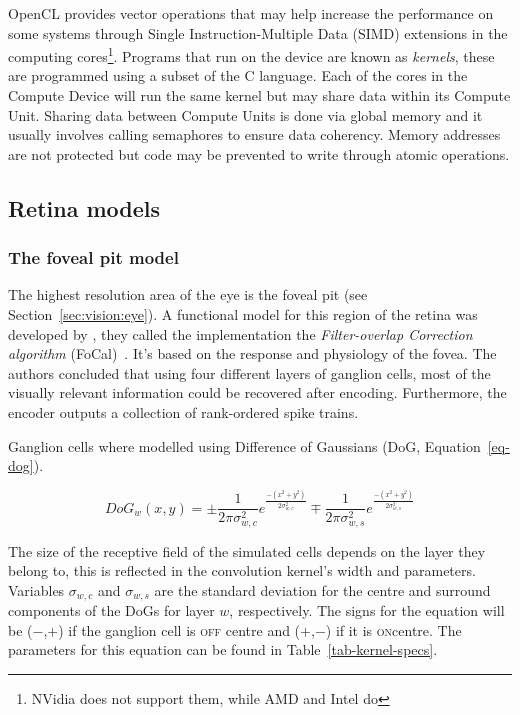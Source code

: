OpenCL provides vector operations that may help increase the performance on some systems through Single Instruction-Multiple Data (SIMD) extensions in the computing cores\footnote{NVidia does not support them, while AMD and Intel do}. Programs that run on the device are known as \emph{kernels}, these are programmed using a subset of the C language. Each of the cores in the Compute Device will run the same kernel but may share data within its Compute Unit. Sharing data between Compute Units is done via global memory and it usually involves calling semaphores to ensure data coherency. Memory addresses are not protected but code may be prevented to write through atomic operations.

\subsection{Retina models}
\subsubsection{The foveal pit model}

The highest resolution area of the eye is the foveal pit (see Section~\ref{sec:vision:eye}). A functional model for this region of the retina was developed by \citeauthor{basab-model}, they called the implementation the \emph{Filter-overlap Correction algorithm} (FoCal)~\cite{basab-model}. It's based on the response and physiology of the fovea. The authors concluded that using four different layers of ganglion cells, most of the visually relevant information could be recovered after encoding. Furthermore, the encoder outputs a collection of rank-ordered spike trains. 

Ganglion cells where modelled using Difference of Gaussians (DoG, Equation~\ref{eq-dog}). 

\begin{equation}
\label{eq-dog}
DoG_w(x,y) = \pm\frac{1}{2\pi\sigma_{w,c}^2}e^{\frac{-(x^2 + y^2)}{2\sigma_{w,c}^2}}
\mp\frac{1}{2\pi\sigma_{w,s}^2}e^{\frac{-(x^2 + y^2)}{2\sigma_{w,s}^2}}
\end{equation}

The size of the receptive field of the simulated cells depends on the layer they belong to, this is reflected in the convolution kernel's width and parameters. Variables $\sigma_{w,c}$ and $\sigma_{w,s}$ are the standard deviation for the centre and surround components of the DoGs for layer $w$, respectively. The signs for the equation will be ($-$,$+$) if the ganglion cell is \textsc{off} centre and ($+$,$-$) if it is \textsc{on}centre. The parameters for this equation can be found in Table~\ref{tab-kernel-specs}.

